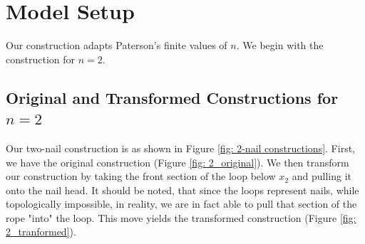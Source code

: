 \documentclass[12pt]{article}
\begin{document}
\pagebreak
\section{Model Setup}\label{chapter 4}
Our construction adapts Paterson's finite values of $n$.
We begin with the construction for $n=2$.



\subsection{Original and Transformed Constructions for \texorpdfstring{$n=2$}{n=2}}

Our two-nail construction is as shown in Figure \ref{fig: 2-nail constructions}.
First, we have the original construction (Figure \ref{fig: 2_original}).
We then transform our construction by taking the front section of the loop below $x_2$ and pulling it onto the nail head.
It should be noted, that since the loops represent nails, while topologically impossible, in reality, we are in fact able to pull that section of the rope "into" the loop.
This move yields the transformed construction (Figure \ref{fig: 2_tranformed}).
\end{document}
